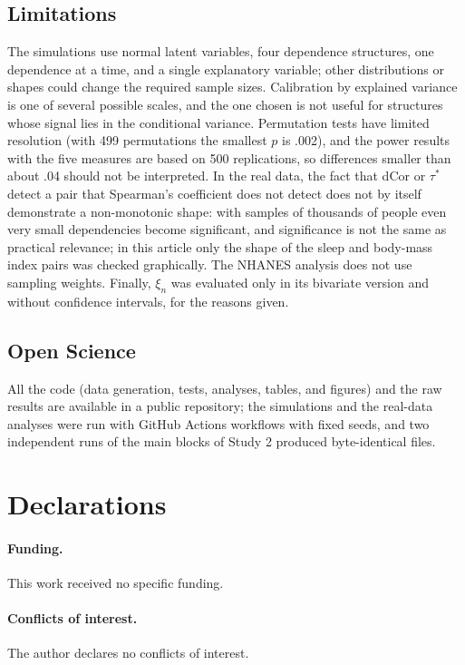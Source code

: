 \documentclass[man,mask,donotrepeattitle,floatsintext]{apa7}
\begin{document}
\subsection{Limitations}

The simulations use normal latent variables, four dependence structures, one dependence at a time, and a single explanatory variable; other distributions or shapes could change the required sample sizes. Calibration by explained variance is one of several possible scales, and the one chosen is not useful for structures whose signal lies in the conditional variance. Permutation tests have limited resolution (with 499 permutations the smallest $p$ is .002), and the power results with the five measures are based on 500 replications, so differences smaller than about .04 should not be interpreted. In the real data, the fact that dCor or $\tau^*$ detect a pair that Spearman's coefficient does not detect does not by itself demonstrate a non-monotonic shape: with samples of thousands of people even very small dependencies become significant, and significance is not the same as practical relevance; in this article only the shape of the sleep and body-mass index pairs was checked graphically. The NHANES analysis does not use sampling weights. Finally, $\xi_n$ was evaluated only in its bivariate version and without confidence intervals, for the reasons given.

\subsection{Open Science}

All the code (data generation, tests, analyses, tables, and figures) and the raw results are available in a public repository; the simulations and the real-data analyses were run with GitHub Actions workflows with fixed seeds, and two independent runs of the main blocks of Study 2 produced byte-identical files.

\section*{Declarations}

\paragraph{Funding.} This work received no specific funding.

\paragraph{Conflicts of interest.} The author declares no conflicts of interest.
\end{document}

